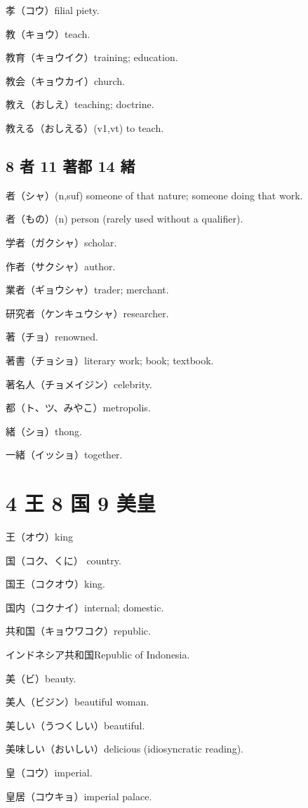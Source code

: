 孝（コウ）filial piety.

教（キョウ）teach.

教育（キョウイク）training; education.

教会（キョウカイ）church.

教え（おしえ）teaching; doctrine.

教える（おしえる）(v1,vt) to teach.

\subsection{8 者 11 著都 14 緒}

者（シャ）(n,suf) someone of that nature; someone doing that work.

者（もの）(n) person (rarely used without a qualifier).

学者（ガクシャ）scholar.

作者（サクシャ）author.

業者（ギョウシャ）trader; merchant.

研究者（ケンキュウシャ）researcher.

著（チョ）renowned.

著書（チョショ）literary work; book; textbook.

著名人（チョメイジン）celebrity.

都（ト、ツ、みやこ）metropolis.

緒（ショ）thong.

一緒（イッショ）together.

\section{4 王 8 国 9 美皇}

王（オウ）king

国（コク、くに） country.

国王（コクオウ）king.

国内（コクナイ）internal; domestic.

共和国（キョウワコク）republic.

インドネシア共和国Republic of Indonesia.

美（ビ）beauty.

美人（ビジン）beautiful woman.

美しい（うつくしい）beautiful.

美味しい（おいしい）delicious (idiosyncratic reading).

皇（コウ）imperial.

皇居（コウキョ）imperial palace.


